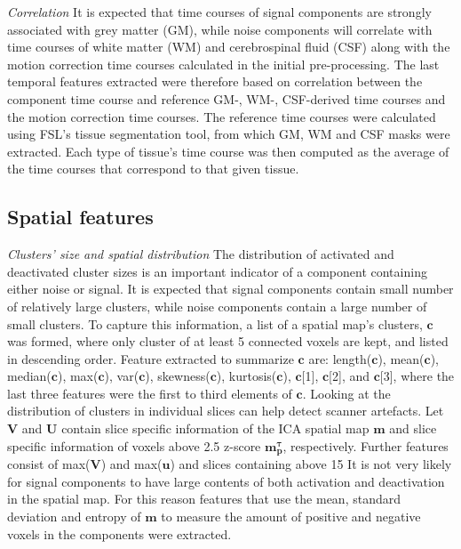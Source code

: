 \textit{Correlation} It is expected that time courses of signal components are strongly associated with grey matter (GM), while noise components will correlate with time courses of white matter (WM) and cerebrospinal fluid (CSF) along with the motion correction time courses calculated in the initial pre-processing. The last temporal features extracted were therefore based on correlation between the component time course and reference GM-, WM-, CSF-derived time courses and the motion correction time courses. The reference time courses were calculated using FSL’s tissue segmentation tool, from which GM, WM and CSF masks were extracted. Each type of tissue’s time course was then computed as the average of the time courses that correspond to that given tissue. \cite{Salimi-Khorshidi2014}

\subsection{Spatial features}
\textit{Clusters’ size and spatial distribution} The distribution of activated and deactivated cluster sizes is an important indicator of a component containing either noise or signal. It is expected that signal components contain small number of relatively large clusters, while noise components contain a large number of small clusters. To capture this information, a list of a spatial map’s clusters, $\mathbf{c}$ was formed, where only cluster of at least 5 connected voxels are kept, and listed in descending order. Feature extracted to summarize $\mathbf{c}$ are: length($\mathbf{c}$), mean($\mathbf{c}$), median($\mathbf{c}$), max($\mathbf{c}$), var($\mathbf{c}$), skewness($\mathbf{c}$), kurtosis($\mathbf{c}$), $\mathbf{c}$[1], $\mathbf{c}$[2], and $\mathbf{c}$[3], where the last three features were the first to third elements of $\mathbf{c}$.
Looking at the distribution of clusters in individual slices can help detect scanner artefacts. Let $\mathbf{V}$ and $\mathbf{U}$ contain slice specific information of the ICA spatial map $\mathbf{m}$ and slice specific information of voxels above 2.5 z-score $\mathbf{m^{\tau}_{p}}$, respectively. Further features consist of max($\mathbf{V}$) and max($\mathbf{u}$) and slices containing above 15 %
It is not very likely for signal components to have large contents of both activation and deactivation in the spatial map. For this reason features that use the mean, standard deviation and entropy of $\mathbf{m}$ to measure the amount of positive and negative voxels in the components were extracted. \\

